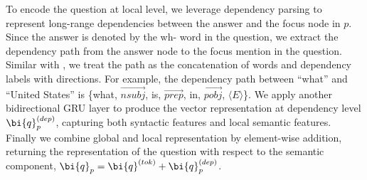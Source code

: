 To encode the question at local level,
we leverage dependency parsing to represent
long-range dependencies between the answer and the focus node in $p$.
Since the answer is denoted by the wh- word in the question,
we extract the dependency path from the answer node to the focus mention in the question.
Similar with \citet{xu2016question},
we treat the path as the concatenation of words and dependency labels with directions.
For example, the dependency path between ``what'' and ``United States'' is
\{what, $\overrightarrow{nsubj}$, is, $\overrightarrow{prep}$, in, $\overrightarrow{pobj}$, $\langle E \rangle$\}.
We apply another bidirectional GRU layer to produce the vector representation at dependency level
$\bi{q}_p^{(dep)}$, capturing both syntactic features and local semantic features.
Finally we combine global and local representation by element-wise addition,
returning the representation of the question with respect to the semantic component, 
$\bi{q}_p = \bi{q}^{(tok)} + \bi{q}_p^{(dep)}$.





